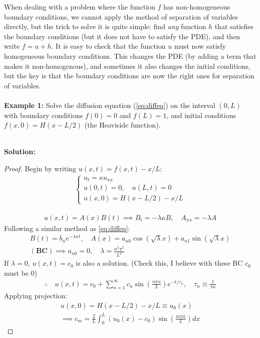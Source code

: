 When dealing with a problem where the function $f$ has non-homogeneous boundary conditions, we cannot apply the method of separation of variables directly, but the trick to solve it is quite simple: find {\it any} function $h$ that satisfies the boundary conditions (but it does not have to satisfy the PDE), and then write $f = u+ h$. It is easy to check that the function $u$ must now satisfy homogeneous  boundary conditions. This changes the PDE (by adding a term that makes it non-homogenous), and sometimes it also changes the initial conditions, but the key is that the boundary conditions are now the right ones for separation of variables. 
\\
\\
{\bf Example 1:} Solve the diffusion equation (\ref{eq:diffeq}) on the interval $(0,L)$ with boundary conditions $f(0) = 0$ and $f(L) = 1$, and initial conditions $f(x,0) = H(x-L/2)$ (the Heaviside function). 
\\
\\
{\color{red} {\bf Solution: 

\begin{proof}
    Begin by writing $u(x,t) = f(x,t) - x/L$:
    \begin{gather*}
        \begin{cases}
            u_t = \kappa u_{xx}\\
            u(0,t)  = 0,\quad  u(L,t) = 0 \\
            u(x,0) = H(x-L/2) - x/L
        \end{cases}
        \label{lect3:ex1}
        \tag{\bf EX 1}
    \end{gather*}

    \begin{gather*}
        u(x,t) = A(x)B(t) \implies B_t = -\lambda\kappa B, \quad A_{xx} = -\lambda A
    \end{gather*}
    Following a similar method as \eqref{eq:diffeq}:
    \begin{gather*}
        B(t) = b_n e^{-\lambda\kappa t}, \quad A(x) = a_{n0} \cos \left(\sqrt{\lambda}x \right) + a_{n1} \sin \left(\sqrt{\lambda} x\right) \\
        \left(\mathbf{BC} \right) \implies a_{n0} = 0, \quad \lambda = \frac{n^2 \pi^2}{L^2}
    \end{gather*}
    If $\lambda = 0$, $u(x,t) = c_0$ is also a solution. (Check this, I believe with these BC $c_0$ must be 0)
    \begin{gather*}
        \therefore \quad u(x,t) = c_0 + \sum_{n=1}^\infty c_n \sin\left( \frac{n\pi x}{L} \right) e^{-t / \tau_n}, \quad \tau_n \equiv \frac{1}{\lambda\kappa}
    \end{gather*}
    Applying projection:
    \begin{gather*}
        u(x,0) = H(x-L/2) - x/L \equiv u_0(x) \\
        \implies c_m = \frac{2}{L} \int_0^L (u_0(x) - c_0) \sin\left(\frac{m \pi x}{L} \right) dx
    \end{gather*}
\end{proof}

} }
\\

